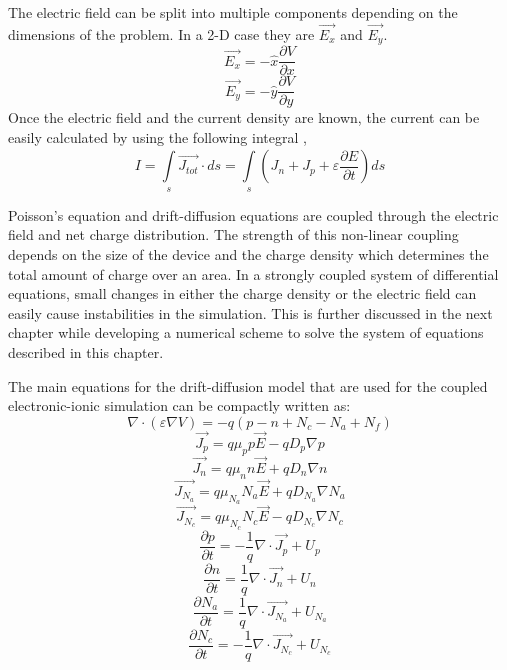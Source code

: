 \begin{doublespace}
The electric field can be split into multiple components depending on the dimensions of the problem. In a 2-D case they are $\vec{E_x}$ and $\vec{E_y}$.
\begin{equation}
\vec{E_x}=-\hat{x}\frac{\partial V}{\partial x}
\end{equation}
\begin{equation}
\vec{E_y}=-\hat{y}\frac{\partial V}{\partial y}
\end{equation}
Once the electric field and the current density are known, the current can be easily calculated by using the following integral \cite{snowden},
\begin{equation}
I=\int\limits_{s}^{}\vec{J_{tot}} \cdot ds = \int\limits_{s}^{}(J_n+J_p+\varepsilon\frac{\partial E}{\partial t})ds
\end{equation}

Poisson's equation and drift-diffusion equations are coupled through the electric field and net charge distribution. The strength of this non-linear coupling depends on the size of the device and the charge density which determines the total amount of charge over an area. In a strongly coupled system of differential equations, small changes in either the charge density or the electric field can easily cause instabilities in the simulation. This is further discussed in the next chapter while developing a numerical scheme to solve the system of equations described in this chapter. 

The main equations for the drift-diffusion model that are used for the coupled electronic-ionic simulation can be compactly written as:
\begin{equation}
\nabla \cdot  (\varepsilon \nabla V)=-q(p-n+N_{c}-N_{a}+N_{f})
\end{equation}
\begin{equation}
\vec{J_p}=q\mu_p p \vec{E}-q D_p \nabla p
\end{equation}
\begin{equation}
\vec{J_n}=q\mu_n n \vec{E}+q D_n \nabla n
\end{equation}
\begin{equation}
\vec{J_{N_{a}}}=q\mu_{N_{a}} N_{a} \vec{E}+q D_{N_{a}} \nabla N_{a} 
\end{equation}
\begin{equation}
\vec{J_{N_{c}}}=q\mu_{N_{c}} N_{c} \vec{E}-q D_{N_{c}} \nabla N_{c}
\end{equation}
\begin{equation}
\frac{\partial p}{\partial t}=-\frac{1}{q}\nabla \cdot \vec{J_p}  + U_{p}
\end{equation}
\begin{equation}
\frac{\partial n}{\partial t}=\frac{1}{q}\nabla \cdot \vec{J_n}+ U_{n}
\end{equation}
\begin{equation}
\frac{\partial N_{a}}{\partial t}=\frac{1}{q}\nabla \cdot \vec{J_{N_{a}}} + U_{N_{a}}
\end{equation}
\begin{equation}
\frac{\partial N_{c}}{\partial t}=-\frac{1}{q}\nabla \cdot \vec{J_{ N_{c} }}+ U_{N_{c}}
\end{equation}


\end{doublespace}
